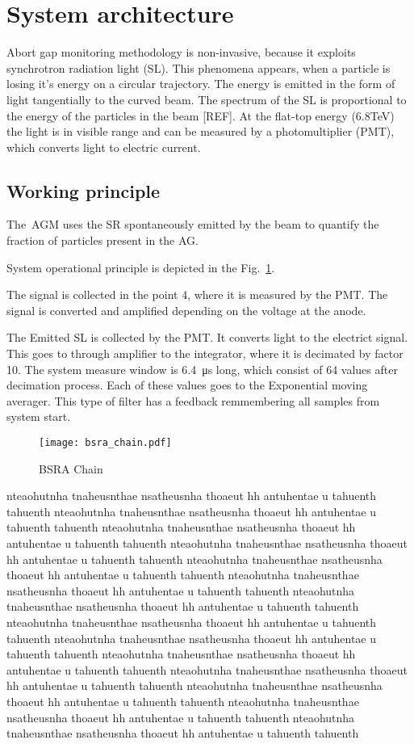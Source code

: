 \section{System architecture}
Abort gap monitoring methodology is non-invasive, because it exploits
synchrotron radiation light (SL). This phenomena appears, when a particle is
losing it's energy on a circular trajectory. The energy is emitted in the form
of light tangentially to the curved beam. The spectrum of the SL is
proportional to the energy of the particles in the beam [REF]. At the flat-top
energy (6.8TeV) the light is in visible range and can be measured by a
photomultiplier (PMT), which converts light to electric current. 

\subsection{Working principle}
The~AGM uses the SR
spontaneously emitted by the beam to quantify the fraction of particles present
in the AG.

System operational principle is depicted in the Fig.~\ref{fig:bsra_chain}. 

The signal is collected in the point 4, where it is measured by the PMT. The
signal is converted and amplified depending on the voltage at the anode.

The Emitted SL is collected by the PMT. It converts light to the electrict
signal. This goes to through amplifier to the integrator, where it is decimated
by factor 10. The system measure window is \SI{6.4}{\micro\second} long, which
consist of 64 values after decimation process. Each of these values goes to the
Exponential moving averager. This type of filter has a feedback remmembering
all samples from system start.  
\begin{figure}[!tbh]
    \centering
    \texttt{[image: bsra\_chain.pdf]}
    \caption{BSRA Chain}
    \label{fig:bsra_chain}
\end{figure}
nteaohutnha tnaheusnthae nsatheusnha thoaeut hh antuhentae u tahuenth tahuenth
nteaohutnha tnaheusnthae nsatheusnha thoaeut hh antuhentae u tahuenth tahuenth
nteaohutnha tnaheusnthae nsatheusnha thoaeut hh antuhentae u tahuenth tahuenth
nteaohutnha tnaheusnthae nsatheusnha thoaeut hh antuhentae u tahuenth tahuenth
nteaohutnha tnaheusnthae nsatheusnha thoaeut hh antuhentae u tahuenth tahuenth
nteaohutnha tnaheusnthae nsatheusnha thoaeut hh antuhentae u tahuenth tahuenth
nteaohutnha tnaheusnthae nsatheusnha thoaeut hh antuhentae u tahuenth tahuenth
nteaohutnha tnaheusnthae nsatheusnha thoaeut hh antuhentae u tahuenth tahuenth
nteaohutnha tnaheusnthae nsatheusnha thoaeut hh antuhentae u tahuenth tahuenth
nteaohutnha tnaheusnthae nsatheusnha thoaeut hh antuhentae u tahuenth tahuenth
nteaohutnha tnaheusnthae nsatheusnha thoaeut hh antuhentae u tahuenth tahuenth
nteaohutnha tnaheusnthae nsatheusnha thoaeut hh antuhentae u tahuenth tahuenth
nteaohutnha tnaheusnthae nsatheusnha thoaeut hh antuhentae u tahuenth tahuenth
nteaohutnha tnaheusnthae nsatheusnha thoaeut hh antuhentae u tahuenth tahuenth

